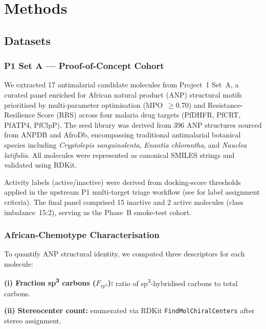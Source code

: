 \section{Methods}


\subsection{Datasets}

\subsubsection{P1 Set A — Proof-of-Concept Cohort}

We extracted \num{17} antimalarial candidate molecules from Project~1 Set~A\cite{sao2026p1},
a curated panel enriched for African natural product (ANP) structural motifs
prioritised by multi-parameter optimisation (MPO~$\geq 0.70$) and
Resistance-Resilience Score (RRS) across four malaria drug targets
(PfDHFR, PfCRT, PfATP4, PfClpP). The seed library was derived from
\num{396} ANP structures sourced from ANPDB\cite{betow2025} and
AfroDb\cite{ntie2017afrodb}, encompassing traditional antimalarial botanical
species including \textit{Cryptolepis sanguinolenta}, \textit{Enantia chlorantha},
and \textit{Nauclea latifolia}. All molecules were represented as canonical SMILES
strings and validated using RDKit\cite{rdkit}.

Activity labels (active/inactive) were derived from docking-score thresholds
applied in the upstream P1 multi-target triage workflow
(see  for label assignment criteria). The final panel comprised
\num{15} inactive and \num{2} active molecules (class imbalance~15:2),
serving as the Phase~B smoke-test cohort.

\subsubsection{African-Chemotype Characterisation}

To quantify ANP structural identity, we computed three descriptors for each molecule:

\textbf{(i) Fraction sp\textsuperscript{3} carbons ($F_{sp^3}$):} ratio of
sp\textsuperscript{3}-hybridised carbons to total carbons\cite{lovering2009escape}.

\textbf{(ii) Stereocenter count:} enumerated via RDKit
\texttt{FindMolChiralCenters} after stereo assignment\cite{newman2020natural}.

